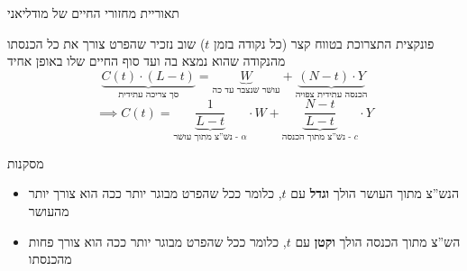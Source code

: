 \documentclass[usenames,dvipsnames]{beamer}
\begin{document}
\begin{RTL}
\begin{frame}[allowframebreaks]{תאוריית מחזורי החיים של מודליאני}
\begin{flushleft}
\end{flushleft}

\framebreak
\begin{block}{פונקצית התצרוכת בטווח קצר (כל נקודה בזמן $t$)}
    שוב נזכיר שהפרט צורך את כל הכנסתו מהנקודה שהוא נמצא בה ועד סוף החיים שלו באופן אחיד
    $$
   \underbrace{ C\left(t\right) \cdot \left(L-t\right)}_{\text{סך צריכה עתידית}} = \underbrace{W}_{\text{עושר שנצבר עד כה}} + \underbrace{ \left(N-t\right) \cdot Y}_{\text{הכנסה עתידית צפויה}}
   $$
   $$
   \implies C(t) = \underbrace{\frac{1}{L-t}}_{\text{נש''צ מתוך עושר - $\alpha$}}\cdot W +\underbrace{ \frac{N-t}{L-t}}_{\text{נש''צ מתוך הכנסה - $c$}}\cdot Y
   $$


    
\end{block}

\begin{exampleblock}{מסקנות}
    \begin{itemize}
        \item הנש''צ מתוך העושר הולך \textbf{וגדל} עם $t$, כלומר ככל שהפרט מבוגר יותר ככה הוא צורך יותר מהעושר
        \item הש''צ מתוך הכנסה הולך \textbf{וקטן} עם $t$, כלומר ככל שהפרט מבוגר יותר ככה הוא צורך פחות מהכנסתו
    \end{itemize}
    

\end{exampleblock}
\end{frame}
\end{RTL}
\end{document}
